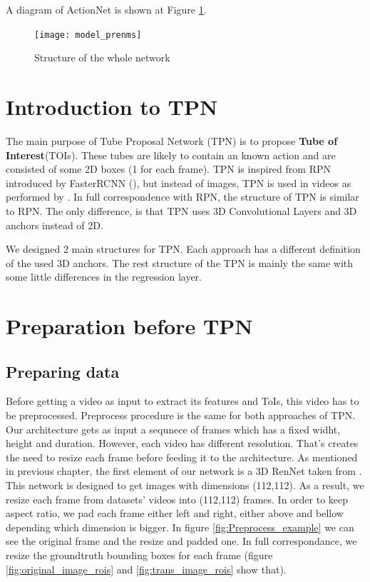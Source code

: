 A diagram of ActionNet is shown at Figure \ref{fig:whole_network_}.

\begin{figure}[h]
  \centering
  \texttt{[image: model\_prenms]}
  \caption{Structure of the whole network}
  \label{fig:whole_network_}
\end{figure}

\section{Introduction to TPN}
 The main purpose of Tube Proposal Network (TPN)  is to propose
\textbf{Tube of Interest}(TOIs). These tubes are likely to contain an known action and are consisted of some 2D boxes
(1 for each frame). TPN is inspired from RPN introduced by FasterRCNN (\cite{Ren:2015:FRT:2969239.2969250}), but instead of images, TPN
is used in videos as performed by \cite{DBLP:journals/corr/HouCS17}. In full correspondence with RPN, the structure
of TPN is similar to RPN. The only difference, is that TPN uses 3D Convolutional Layers and 3D anchors instead of 2D. \par
We designed 2 main structures for TPN. Each approach has a different definition of the used 3D anchors.
The rest structure of the TPN is mainly the same with some little differences in the regression layer. \par

\section{Preparation before TPN}

\subsection{Preparing data}
Before getting a video as input to extract its features and ToIs, this video has to be preprocessed.
Preprocess procedure  is the same for both approaches of TPN.
Our architecture gets as input a sequnece of frames which has a fixed  widht, height and duration. However, each video has different resolution. That's creates the
need to resize each frame before feeding it to the architecture.
As mentioned in previous chapter, the first element of our network is a 3D RenNet taken from \cite{hara3dcnns}. This network is designed to
get images with dimensions (112,112). As a result, we resize each frame from datasets' videos into (112,112) frames. In order to keep aspect ratio, we pad each frame either
left and right, either above and bellow depending which dimension is bigger. In figure  \ref{fig:Preprocess_example} we can see the original frame and the resize and padded one.
In full correspondance, we resize the groundtruth bounding boxes for each frame (figure \ref{fig:original_image_rois} and \ref{fig:trans_image_rois} show that).

